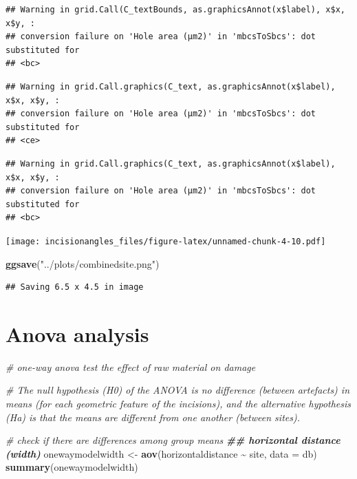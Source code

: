 \documentclass[
]{article}
\newenvironment{Shaded}{\begin{snugshade}}{\end{snugshade}}
\newcommand{\AttributeTok}[1]{\textcolor[rgb]{0.13,0.29,0.53}{#1}}
\newcommand{\CommentTok}[1]{\textcolor[rgb]{0.56,0.35,0.01}{\textit{#1}}}
\newcommand{\DocumentationTok}[1]{\textcolor[rgb]{0.56,0.35,0.01}{\textbf{\textit{#1}}}}
\newcommand{\FunctionTok}[1]{\textcolor[rgb]{0.13,0.29,0.53}{\textbf{#1}}}
\newcommand{\NormalTok}[1]{#1}
\newcommand{\OtherTok}[1]{\textcolor[rgb]{0.56,0.35,0.01}{#1}}
\newcommand{\SpecialCharTok}[1]{\textcolor[rgb]{0.81,0.36,0.00}{\textbf{#1}}}
\newcommand{\StringTok}[1]{\textcolor[rgb]{0.31,0.60,0.02}{#1}}
\begin{document}
\begin{verbatim}
## Warning in grid.Call(C_textBounds, as.graphicsAnnot(x$label), x$x, x$y, :
## conversion failure on 'Hole area (μm2)' in 'mbcsToSbcs': dot substituted for
## <bc>
\end{verbatim}

\begin{verbatim}
## Warning in grid.Call.graphics(C_text, as.graphicsAnnot(x$label), x$x, x$y, :
## conversion failure on 'Hole area (μm2)' in 'mbcsToSbcs': dot substituted for
## <ce>
\end{verbatim}

\begin{verbatim}
## Warning in grid.Call.graphics(C_text, as.graphicsAnnot(x$label), x$x, x$y, :
## conversion failure on 'Hole area (μm2)' in 'mbcsToSbcs': dot substituted for
## <bc>
\end{verbatim}

\texttt{[image: incisionangles\_files/figure-latex/unnamed-chunk-4-10.pdf]}

\begin{Shaded}
\begin{Highlighting}[]
\FunctionTok{ggsave}\NormalTok{(}\StringTok{"../plots/combinedsite.png"}\NormalTok{)}
\end{Highlighting}
\end{Shaded}

\begin{verbatim}
## Saving 6.5 x 4.5 in image
\end{verbatim}

\hypertarget{anova-analysis}{%
\section{Anova analysis}\label{anova-analysis}}

\begin{Shaded}
\begin{Highlighting}[]
\CommentTok{\# one{-}way anova test the effect of raw material on damage}

\CommentTok{\# The null hypothesis (H0) of the ANOVA is no difference (between artefacts) in means (for each geometric feature of the incisions), and the alternative hypothesis (Ha) is that the means are different from one another (between sites).}

\CommentTok{\# check if there are differences among group means}
\DocumentationTok{\#\# horizontal distance (width)}
\NormalTok{onewaymodelwidth }\OtherTok{\textless{}{-}} \FunctionTok{aov}\NormalTok{(horizontaldistance }\SpecialCharTok{\textasciitilde{}}\NormalTok{ site, }\AttributeTok{data =}\NormalTok{ db)}
\FunctionTok{summary}\NormalTok{(onewaymodelwidth)}
\end{Highlighting}
\end{Shaded}
\end{document}
